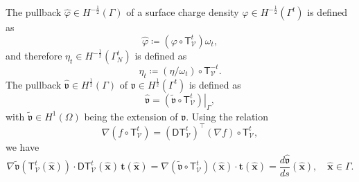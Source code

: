 \documentclass{article}
\theoremstyle{remark}
\newcommand{\T}{\mathsf{T}}
\newcommand{\tg}{\boldsymbol{t}}
\newcommand{\hatx}{\widehat{\boldsymbol{x}}}
\newcommand{\argv}{\mathfrak{v}}
\newcommand{\hatv}{\widehat{\argv}}
\newcommand{\hatvphi}{\widehat{\varphi}}
\newcommand{\Nu}{\mathcal{V}}
\newcommand{\Tt}{\T_\Nu^t}
\newcommand{\DTt}{\mathsf{DT}_\Nu^t}
\newcommand{\ot}{\omega_t}
\begin{document}
The pullback $\hatvphi\in H^{-\frac{1}{2}}(\Gamma)$ of a surface charge density $\varphi\in H^{-\frac{1}{2}}(\Gamma^t)$ is defined as
\begin{equation}
    \hatvphi\coloneqq\left(\varphi\circ\Tt\right)\ot,
\end{equation}
and therefore $\eta_t\in H^{-\frac{1}{2}}(\Gamma_N^t)$ is defined as
\begin{equation}
\label{eq:eta-t}
    \eta_t\coloneqq(\eta/\ot)\circ\T_\Nu^{-t}.
\end{equation}
The pullback $\hatv\in H^{\frac{1}{2}}(\Gamma)$ of $\argv\in H^{\frac{1}{2}}(\Gamma^t)$ is defined as
\begin{equation}
    \hatv=\left.\left(\widetilde{\argv}\circ\Tt\right)\right|_{\Gamma},
\end{equation}
with $\widetilde{\argv}\in H^1(\Omega)$ being the extension of $\argv$. Using the relation \cite[Section~4.1]{s-g}
\begin{equation}
    \nabla(f\circ\Tt)=(\DTt)^\top(\nabla f)\circ\Tt,
\end{equation}
we have
\begin{equation}
    \nabla\widetilde{\argv}(\Tt(\hatx))\cdot\DTt(\hatx)\,\tg(\hatx)=\nabla(\widetilde{\argv}\circ\Tt)(\hatx)\cdot\tg(\hatx)=\frac{d\hatv}{ds}(\hatx),\quad \hatx\in\Gamma.
\end{equation}
\end{document}
